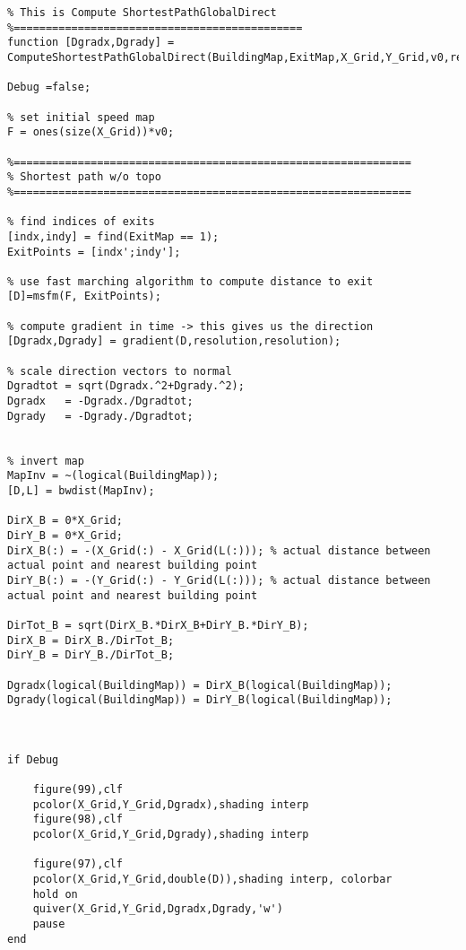 \lstset{basicstyle=\footnotesize\ttfamily}
    
\begin{lstlisting}[breaklines]
%=============================================
% This is Compute ShortestPathGlobalDirect
%=============================================
function [Dgradx,Dgrady] = ComputeShortestPathGlobalDirect(BuildingMap,ExitMap,X_Grid,Y_Grid,v0,resolution)

Debug =false;

% set initial speed map
F = ones(size(X_Grid))*v0;

%==============================================================
% Shortest path w/o topo
%==============================================================

% find indices of exits
[indx,indy] = find(ExitMap == 1);
ExitPoints = [indx';indy'];

% use fast marching algorithm to compute distance to exit
[D]=msfm(F, ExitPoints);

% compute gradient in time -> this gives us the direction
[Dgradx,Dgrady] = gradient(D,resolution,resolution);

% scale direction vectors to normal
Dgradtot = sqrt(Dgradx.^2+Dgrady.^2);
Dgradx   = -Dgradx./Dgradtot;
Dgrady   = -Dgrady./Dgradtot;


% invert map
MapInv = ~(logical(BuildingMap));
[D,L] = bwdist(MapInv);

DirX_B = 0*X_Grid;
DirY_B = 0*X_Grid;
DirX_B(:) = -(X_Grid(:) - X_Grid(L(:))); % actual distance between actual point and nearest building point
DirY_B(:) = -(Y_Grid(:) - Y_Grid(L(:))); % actual distance between actual point and nearest building point

DirTot_B = sqrt(DirX_B.*DirX_B+DirY_B.*DirY_B);
DirX_B = DirX_B./DirTot_B;
DirY_B = DirY_B./DirTot_B;

Dgradx(logical(BuildingMap)) = DirX_B(logical(BuildingMap));
Dgrady(logical(BuildingMap)) = DirY_B(logical(BuildingMap));



if Debug

    figure(99),clf
    pcolor(X_Grid,Y_Grid,Dgradx),shading interp
    figure(98),clf
    pcolor(X_Grid,Y_Grid,Dgrady),shading interp

    figure(97),clf
    pcolor(X_Grid,Y_Grid,double(D)),shading interp, colorbar
    hold on
    quiver(X_Grid,Y_Grid,Dgradx,Dgrady,'w')
    pause
end
\end{lstlisting}